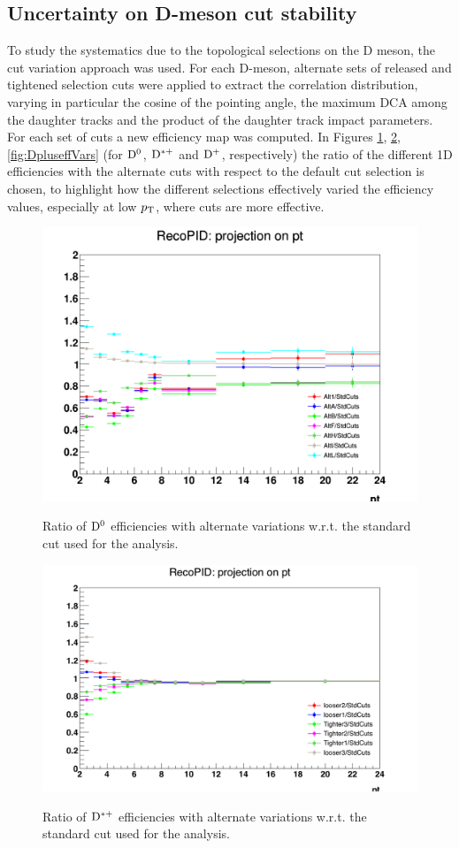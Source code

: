 \subsection{Uncertainty on D-meson cut stability}
To study the systematics due to the topological selections on the D meson, the cut variation approach was used. For each D-meson, alternate sets of released and tightened selection cuts were applied to extract the correlation distribution, varying in particular the cosine of the pointing angle, the maximum DCA among the daughter tracks and the product of the daughter track impact parameters. For each set of cuts a new efficiency map was computed.
In Figures \ref{fig:D0effVars}, \ref{fig:DstareffVars}, \ref{fig:DpluseffVars} (for ${\rm D^0}$, ${\rm D^{*+}}$ and ${\rm D^+}$, respectively) the ratio of the different 1D efficiencies with the alternate cuts with respect to the default cut selection is chosen, to highlight how the different selections effectively varied the efficiency values, especially at low $p_{\rm T}$, where cuts are more effective.

\begin{figure}[h]
\centering
{\includegraphics[width=.7\linewidth]{figures/Systematics/Dzero/CutVar/RatioPromptEff1DMap.png}}
\caption{Ratio of ${\rm D^0}$ efficiencies with alternate variations w.r.t. the standard cut used for the analysis.}
\label{fig:D0effVars}
\end{figure}

\begin{figure}[h]
\centering
{\includegraphics[width=.7\linewidth]{figures/Systematics/Dstar/CutVar/RatioPromptEff1DMap.png}}
\caption{Ratio of ${\rm D^{*+}}$ efficiencies with alternate variations w.r.t. the standard cut used for the analysis.}
\label{fig:DstareffVars}
\end{figure}

